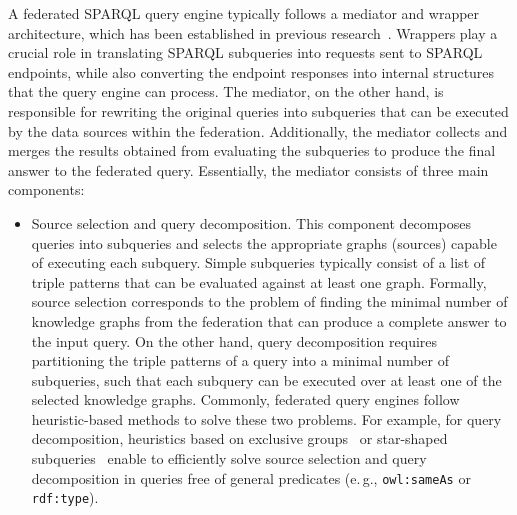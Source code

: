 \documentclass[a4paper,USenglish]{tgdk-v2021}
\newcommand{\arxivonly}[1]{}
\begin{document}
A federated SPARQL query engine typically follows a mediator and wrapper architecture, which has been established in previous research~\cite{Wiederhold92,ZadorozhnyRVUB02}.
Wrappers play a crucial role in translating SPARQL subqueries into requests sent to SPARQL endpoints, while also converting the endpoint responses into internal structures that the query engine can process.
The mediator, on the other hand, is responsible for rewriting the original queries into subqueries that can be executed by the data sources within the federation.
Additionally, the mediator collects and merges the results obtained from evaluating the subqueries to produce the final answer to the federated query.
Essentially, the mediator consists of three main components:
\begin{itemize}
  \item Source selection and query decomposition.
    This component decomposes queries into subqueries and selects the appropriate graphs (sources) capable of executing each subquery.
    Simple subqueries typically consist of a list of triple patterns that can be evaluated against at least one graph.
    Formally, source selection corresponds to the problem of finding the minimal number of knowledge graphs from the federation that can produce a complete answer to the input query.
    On the other hand, query decomposition requires partitioning the triple patterns of a query into a minimal number of subqueries, such that each subquery can be executed over at least one of the selected knowledge graphs.
    Commonly, federated query engines follow heuristic-based methods to solve these two problems.
    For example, for query decomposition, heuristics based on exclusive groups~\cite{DBLP:conf/semweb/SchwarteHHSS11} or star-shaped subqueries~\cite{DBLP:conf/esws/VidalRLMSP10,DBLP:journals/tlsdkcs/VidalCAMP16,DBLP:conf/semweb/MontoyaSH17} enable to efficiently solve source selection and query decomposition in queries free of general predicates (e.\,g., \texttt{owl:sameAs} or \texttt{rdf:type}).

\arxivonly{Moreover, more general approaches (e.\,g., Endris et al.~\cite{DBLP:journals/tlsdkcs/EndrisGLMVA18}) resort to metadata describing the star-shaped patterns existing in a knowledge graph to perform query decomposition and source selection accurately.
An \emph{exclusive group} corresponds to a set of triple patterns (corresponding to a conjunction of the triples) in a SPARQL query that can be exclusively executed over one data source, as in FedX~\cite{DBLP:conf/semweb/SchwarteHHSS11}. 
Such a technique is implemented in the SPARQL engine FedX~\cite{DBLP:conf/semweb/SchwarteHHSS11}, which also optimizes the execution of \emph{star-shaped subqueries} by identifying groups of conjunctive triple patterns that a data source can execute independently from others.}


\end{itemize}
\end{document}
